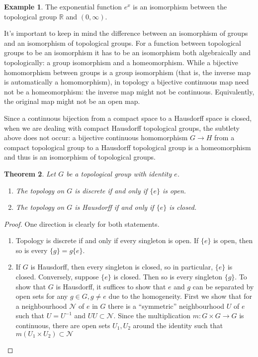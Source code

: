 \documentclass[12pt]{report}
\newtheorem{theorem}{Theorem}[section]
\theoremstyle{definition}
\newtheorem{example}[theorem]{Example}
\newcommand{\RR}{\mathbb{R}}
\begin{document}
\begin{example}
	The exponential function $e^x$ is an isomorphism between the topological group $\RR$ and $(0,\infty)$.
\end{example}

It's important to keep in mind the difference between an isomorphism of groups and an isomorphism of topological groups. For a function between topological groups to be an isomorphism it has to be an isomorphism both algebraically and topologically: a group isomorphism and a homeomorphism. While a bijective homomorphism between groups is a
group isomorphism (that is, the inverse map is automatically a homomorphism), in topology a bijective continuous map need not be a homeomorphism: the inverse map might not be continuous. Equivalently, the original map might not be an open map.

Since a continuous bijection from a compact space to a Hausdorff space is closed, when we are dealing with compact Hausdorff topological groups, the subtlety above does not occur: a bijective continuous homomorphism $G \to H$ from a compact topological group to a Hausdorff topological group is a homeomorphism and thus is an isomorphism of topological groups.

\begin{theorem}
	Let $G$ be a topological group with identity $e$.
	\begin{enumerate}
		\item The topology on $G$ is discrete if and only if $\{e\}$ is open.
		\item The topology on $G$ is Hausdorff if and only if $\{e\}$ is closed.
	\end{enumerate}
\end{theorem}

\begin{proof}
	One direction is clearly for both statements.
	\begin{enumerate}
		\item Topology is discrete if and only if every singleton is open. If $\{e\}$ is open, then so is every $\{g\}=g\{e\}$.
		\item If $G$ is Hausdorff, then every singleton is closed, so in particular, $\{e\}$ is closed.
		Conversely, suppose $\{e\}$ is closed. Then so is every singleton $\{g\}$. To show that $G$ is Hausdorff, it suffices to show that $e$ and $g$ can be separated by open sets for any $g\in G, g\not=e$ due to the homogeneity.
		First we show that for a neighbourhood $\mathcal{N}$ of $e$ in $G$ there is a ``symmetric'' neighbourhood $U$ of $e$ such that $U=U^{-1}$ and $UU\subset \mathcal{N}$. Since the multiplication $m: G\times G\to G$ is continuous, there are open sets $U_1, U_2$ around the identity such that $m(U_1\times U_2)\subset \mathcal{N}$
 	\end{enumerate}
\end{proof}
\end{document}
